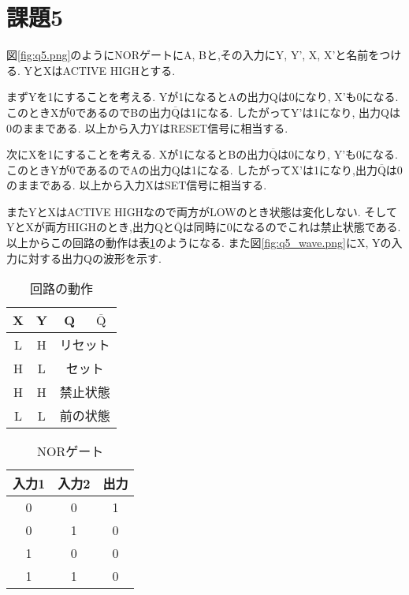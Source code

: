 \section{課題5}
図\ref{fig:q5.png}のようにNORゲートにA, Bと,その入力にY, Y', X, X'と名前をつける.
YとXはACTIVE HIGHとする.

まずYを1にすることを考える.
Yが1になるとAの出力Qは0になり, X'も0になる.
このときXが0であるのでBの出力$\mathrm{\overline{Q}}$は1になる.
したがってY'は1になり, 出力Qは0のままである.
以上から入力YはRESET信号に相当する.

次にXを1にすることを考える.
Xが1になるとBの出力$\mathrm{\overline{Q}}$は0になり, Y'も0になる.
このときYが0であるのでAの出力Qは1になる.
したがってX'は1になり,出力$\mathrm{\overline{Q}}$は0のままである.
以上から入力XはSET信号に相当する.

またYとXはACTIVE HIGHなので両方がLOWのとき状態は変化しない.
そしてYとXが両方HIGHのとき,出力Qと$\mathrm{\overline{Q}}$は同時に0になるのでこれは禁止状態である.
以上からこの回路の動作は表\ref{tab:q5}のようになる.
また図\ref{fig:q5_wave.png}にX, Yの入力に対する出力Qの波形を示す.
\begin{table}[h]
\caption{回路の動作}
\label{tab:q5}
\centering
\begin{tabular}{cccc}
\hline
X&Y&Q&$\mathrm{\overline{Q}}$\\
\hline \hline
L&H&\multicolumn{2}{c}{リセット}\\
H&L&\multicolumn{2}{c}{セット}\\
H&H&\multicolumn{2}{c}{禁止状態}\\
L&L&\multicolumn{2}{c}{前の状態}\\
\hline
\end{tabular}
\end{table}
\begin{table}[h]
\caption{NORゲート}
\label{tab:q5_nor}
\centering
\begin{tabular}{ccc}
\hline
入力1&入力2&出力\\
\hline \hline
0&0&1\\
0&1&0\\
1&0&0\\
1&1&0\\
\hline
\end{tabular}
\end{table}